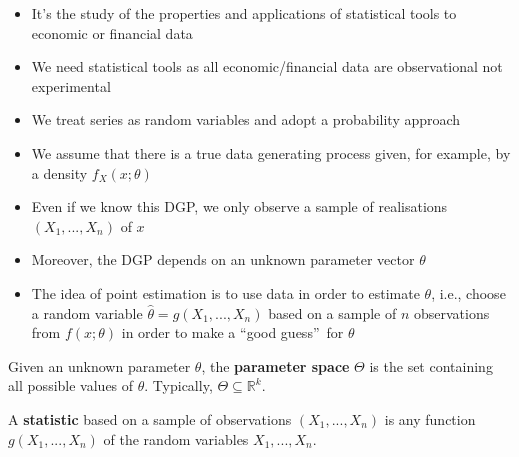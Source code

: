 \documentclass[notes=show]{beamer}
\begin{document}
\begin{frame}%


\begin{itemize}
\item It's the study of the properties and applications of statistical tools
to economic or financial data

\item We need statistical tools as all economic/financial data are
observational not experimental

\item We treat series as random variables and adopt a probability approach

\item We assume that there is a true data generating process given, for
example, by a density $f_{X}\left( x;\theta \right) $

\item Even if we know this DGP, we only observe a sample of realisations $%
\left( X_{1},...,X_{n}\right) $ of $x$

\item Moreover, the DGP depends on an unknown parameter vector $\theta $
\end{itemize}

\end{frame}%

\begin{frame}%


\begin{itemize}
\item The idea of point estimation is to use data in order to estimate $%
\theta $, i.e., choose a random variable $\hat{\theta}=g\left(
X_{1},...,X_{n}\right) $ based on a sample of $n$ observations from $f\left(
x;\theta \right) $ in order to make a \textquotedblleft good
guess\textquotedblright\ for $\theta $
\end{itemize}

\begin{definition}
Given an unknown parameter $\theta $, the \textbf{parameter space} $\Theta $
is the set containing all possible values of $\theta $. Typically, $\Theta
\subseteq \mathbb{R}^{k}$.
\end{definition}

\begin{definition}
A \textbf{statistic} based on a sample of observations $\left(
X_{1},...,X_{n}\right) $ is any function $g\left( X_{1},...,X_{n}\right) $
of the random variables $X_{1},...,X_{n}$.
\end{definition}

\end{frame}%
\end{document}
